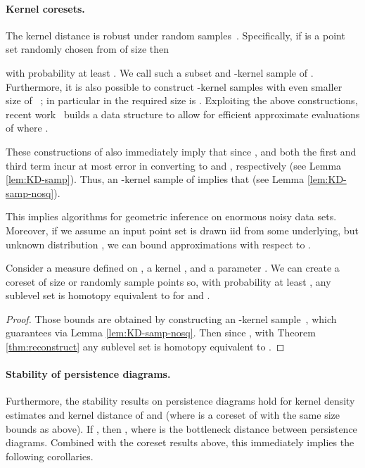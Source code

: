 \documentclass[11pt]{myclass}
\begin{document}
\paragraph{Kernel coresets.}
The kernel distance is robust under random samples~\cite{JoshiKommarajuPhillips2011}.  
Specifically, if  is a point set randomly chosen from  of 
size  then 

with probability at least .  We call such a subset  and -kernel sample of .  
Furthermore, it is also possible to construct -kernel samples  with even smaller size of ~\cite{Phillips2013}; in particular in  the required size is .  
Exploiting the above constructions, recent work~\cite{big-kde} builds a data structure to allow for efficient approximate evaluations of  where .  

These constructions of  also immediately imply that  since , and both the first and third term incur at most  error in converting to  and , respectively (see Lemma \ref{lem:KD-samp}).  
Thus, an -kernel sample  of  implies that  (see Lemma \ref{lem:KD-samp-nosq}).

This implies algorithms for geometric inference on enormous noisy data sets.  
Moreover, if we assume an input point set  is drawn iid from some underlying, but unknown distribution , we can bound approximations with respect to .  


\begin{corollary}
Consider a measure  defined on , a kernel , and a parameter .  
We can create a coreset  of size  or randomly sample  points so, with probability at least , any sublevel set  is homotopy equivalent to  for  and .  
\end{corollary}
\begin{proof}
Those bounds are obtained by constructing an -kernel sample~\cite{JoshiKommarajuPhillips2011,Phillips2013}, which guarantees  via Lemma \ref{lem:KD-samp-nosq}.  
Then since , with Theorem \ref{thm:reconstruct} any sublevel set  is homotopy equivalent to .  
\end{proof}

\paragraph{Stability of persistence diagrams.}
Furthermore, the stability results on persistence diagrams \cite{Cohen-SteinerEdelsbrunnerHarer2007} hold for kernel density estimates and kernel distance of  and  (where  is a coreset of  with the same size bounds as above).  If , then , where  is the bottleneck distance between persistence diagrams.  Combined with the coreset results above, this immediately implies the following corollaries.  
\end{document}
